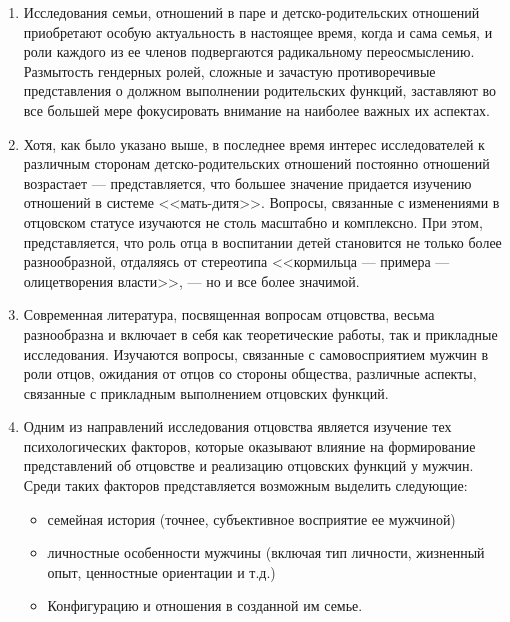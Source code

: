 \documentclass{../../common/thesisbyxetex}
\begin{document}
\begin{enumerate}
 \item Исследования семьи, отношений в паре и детско-родительских отношений приобретают особую 
актуальность в настоящее время, когда и сама семья, и роли каждого из ее членов подвергаются 
радикальному переосмыслению.  Размытость гендерных ролей, сложные и зачастую противоречивые 
представления о должном выполнении родительских функций, заставляют во все большей мере 
фокусировать внимание на наиболее важных их аспектах.

\item Хотя, как было указано выше, в последнее время интерес исследователей к различным сторонам 
детско-родительских отношений постоянно отношений возрастает --- представляется, что большее 
значение 
придается изучению отношений в системе <<мать-дитя>>. Вопросы, связанные с 
изменениями в отцовском 
статусе изучаются не столь масштабно и комплексно. При этом, представляется, что роль отца в 
воспитании детей становится не только более разнообразной, отдаляясь от стереотипа <<кормильца --- 
примера --- олицетворения власти>>, --- но и все более значимой.

\item Современная литература, посвященная вопросам отцовства, весьма разнообразна и включает в себя 
как теоретические работы, так и прикладные исследования. Изучаются вопросы, связанные с 
самовосприятием мужчин в роли отцов, ожидания от отцов со стороны общества, различные аспекты, 
связанные с прикладным выполнением отцовских функций.

\item Одним из направлений исследования отцовства является изучение тех психологических факторов, 
которые оказывают влияние на формирование представлений об отцовстве и реализацию отцовских функций 
у мужчин. Среди таких факторов представляется возможным выделить следующие:
\begin{itemize}
 \item семейная история (точнее, субъективное восприятие ее мужчиной)
 \item личностные особенности мужчины (включая тип личности, жизненный опыт, ценностные ориентации 
и т.д.)
 \item Конфигурацию и отношения в созданной им семье.
\end{itemize}

\end{enumerate}

\end{document}
